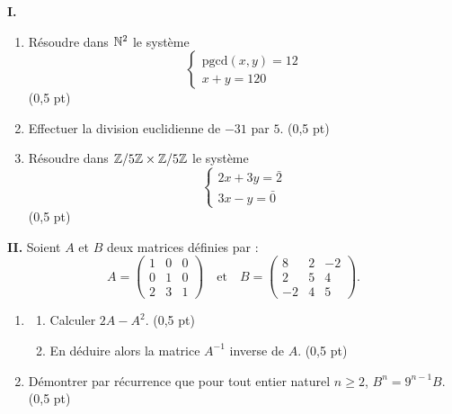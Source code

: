 




\noindent\textbf{I.}
\begin{enumerate}
	\item Résoudre dans $\mathbb{N}^2$ le système
	$$
	\begin{cases}
		\text{pgcd}(x,y) = 12 \\
		x + y = 120
	\end{cases}
	$$
	\hfill (0,5 pt)
	\item Effectuer la division euclidienne de $-31$ par $5$. \hfill (0,5 pt)
	\item Résoudre dans $\mathbb{Z}/5\mathbb{Z} \times \mathbb{Z}/5\mathbb{Z}$ le système
	$$
	\begin{cases}
		2x + 3y = \bar{2} \\
		3x - y = \bar{0}
	\end{cases}
	$$
	\hfill (0,5 pt)
\end{enumerate}

\bigskip

\noindent\textbf{II.} Soient $A$ et $B$ deux matrices définies par :
$$
A = \begin{pmatrix} 1 & 0 & 0 \\ 0 & 1 & 0 \\ 2 & 3 & 1 \end{pmatrix}
\quad \text{et} \quad
B = \begin{pmatrix} 8 & 2 & -2 \\ 2 & 5 & 4 \\ -2 & 4 & 5 \end{pmatrix}.
$$

\begin{enumerate}
	\item
	\begin{enumerate}
		\item Calculer $2A - A^2$. \hfill (0,5 pt)
		\item En déduire alors la matrice $A^{-1}$ inverse de $A$. \hfill (0,5 pt)
	\end{enumerate}
	\item Démontrer par récurrence que pour tout entier naturel $n \geqslant 2$, $B^n = 9^{n-1}B$. \hfill (0,5 pt)
\end{enumerate}


